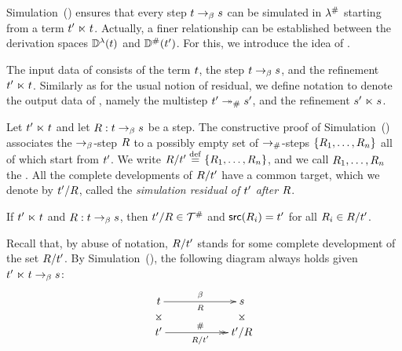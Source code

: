 
Simulation~()
ensures that every step $t \mathrel{\to_\beta} s$ can be simulated
in $\lambda^{\mathtt{\#}}$ starting from a term $t' \mathrel{\ltimes} t$.
Actually, a finer relationship can be established between the
derivation spaces $\mathbb{D}^{\lambda}(t)$ and $\mathbb{D}^{\mathtt{\#}}(t')$.
For this, we introduce the idea of .

The input data of  consists of the term $t$,
the step $t \mathrel{\to_\beta} s$, and the refinement $t' \mathrel{\ltimes} t$.
Similarly as for the usual notion of residual,
we define notation to denote the output data of ,
namely the multistep $t' \mathrel{\mathrel{\twoheadrightarrow}_{\mathtt{\#}}} s'$, and the refinement $s' \mathrel{\ltimes} s$.

\begin{definition}
Let $t' \mathrel{\ltimes} t$ and let $R : t \mathrel{\to_\beta} s$ be a step.
The constructive proof of Simulation~()
associates the $\mathrel{\to_\beta}$-step $R$ to a possibly empty set of $\mathrel{\to_{\mathtt{\#}}}$-steps
$\{R_1,\hdots,R_n\}$ all of which start from $t'$.
We write $R/t' \overset{\mathrm{def}}{=} \{R_1,\hdots,R_n\}$,
and we call $R_1,\hdots,R_n$ the .
All the complete developments of $R/t'$ have a common target,
which we denote by $t'/R$,
called the {\em simulation residual of $t'$ after $R$}.
\end{definition}

\begin{remark}
If $t' \mathrel{\ltimes} t$ and $R : t \to_\beta s$,
then $t' / R \in \mathcal{T}^{\mathtt{\#}}$
  and $\mathsf{src}(R_i) = t'$ for all $R_i \in R / t'$.
\end{remark}

Recall that, by abuse of notation, $R/t'$ stands
for some complete development of the set $R/t'$.
By Simulation~(),
the following diagram always holds given $t' \mathrel{\ltimes} t \mathrel{\to_\beta} s$:
\[
  \xymatrix@R=.5cm@C=2cm{
    \tm
      \ar[r]^{\beta}_{\redex}
      \ar@{}[d]|*=0[@]{\rtimes}
  &
    \tmtwo
      \ar@{}[d]|*=0[@]{\rtimes}
  \\
    \tm'
      \ar@{->>}[r]^{\dist}_{\redex/\tm'}
  &
    \tm'/\redex
  }
\]


